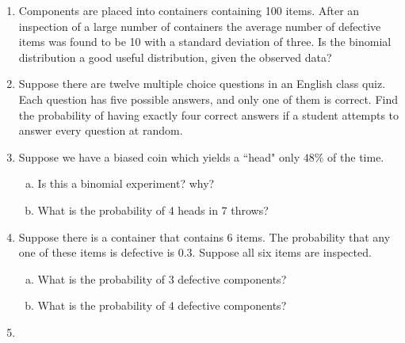 \documentclass[a4paper,12pt]{article}
\begin{document}
\begin{enumerate}
\begin{enumerate}[(a)]
\begin{multicols}{2}
\begin{enumerate}[(i)]
	\item $X \sim Bin(n = 10, p = 0.40)$
	\item $X \sim Bin(n = 15, p = 0.25)$
	\item $X \sim Bin(n = 20, p = 0.30)$
	\item $X \sim Bin(n = 50, p = 0.20)$
	\item $X \sim Bin(n = 200, p = 0.10)$
	\item $X \sim Bin(n = 1000, p = 0.01)$
\end{enumerate}
\end{multicols}
\end{enumerate}

\item Components are placed into containers containing 100 items.
After an inspection of a large number of containers the average number of defective items was found to be 10 with a standard deviation of three.
Is the binomial distribution a good useful distribution, given the observed data?


	
\item Suppose there are twelve multiple choice questions in an English class quiz. Each question has five possible answers, and only one of them is correct. Find the probability of having exactly four correct answers if a student attempts to answer every question at random.	
	
	\item Suppose we have a biased coin which yields a ``head" only $48\%$ of the time.
\begin{enumerate}[(a)]
	

	\item Is this a binomial experiment?  why?
	\item What is the probability of 4 heads in 7 throws?

\end{enumerate}
\item Suppose there is a container that contains 6 items.  The probability that any one of these items is defective is 0.3. Suppose all six items are inspected. 
	\begin{enumerate}[(a)]
		\item What is the probability of 3 defective components?
		\item What is the probability of 4 defective components?
	\end{enumerate}
\item


\end{enumerate}
\end{document}
